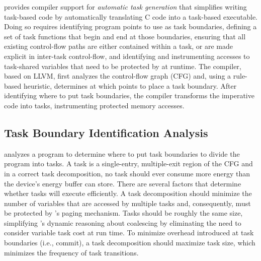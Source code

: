 \sys provides compiler support for \emph{automatic task generation} that simplifies writing task-based code by automatically translating C code into a task-based executable. Doing so requires identifying program points to use as task boundaries, defining a set of task functions that begin and end at those boundaries, ensuring that all existing control-flow paths are either contained within a task, or are made explicit in inter-task control-flow, and identifying and instrumenting accesses to task-shared variables that need to be protected by \sys at runtime. The \sys compiler, based on LLVM, first analyzes the control-flow graph (CFG) and, using a rule-based heuristic, determines at which points to place a task boundary. After identifying where to put task boundaries, the \sys compiler transforms the imperative code into tasks, instrumenting protected memory accesses. 

\subsection{Task Boundary Identification Analysis}
\label{sec:compiler_analysis_pass}

\sys analyzes a program to determine where to put task boundaries to divide the program into tasks. A task is a single-entry, multiple-exit region of the CFG and in a correct task decomposition, no task should ever consume more energy than the device's energy buffer can store. There are several factors that determine whether tasks will execute efficiently. A task decomposition should minimize the number of variables that are accessed by multiple tasks and, consequently, must be protected by \sys's paging mechanism. Tasks should be roughly the same size, simplifying \sys's dynamic reasoning about coalescing by eliminating the need to consider variable task cost at run time. To minimize overhead introduced at task boundaries (i.e., commit), a task decomposition should maximize task size, which minimizes the frequency of task transitions.

%
%

